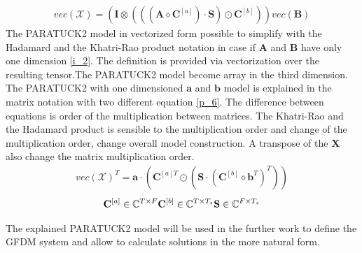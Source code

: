 \begin{align}
vec(\mathcal{X})=(\mathbf{I} \otimes (((\mathbf{A}\diamond \mathbf{C}^{[a]}) \cdot \mathbf{S}) \odot \mathbf{C}^{[b]} ))vec(\mathbf{B})
\label{p_5}
\end{align}
 The PARATUCK2 model in vectorized form possible to simplify with the Hadamard and the Khatri-Rao product notation in case if $\mathbf{A}$ and $\mathbf{B}$ have only one dimension \eqref{i_2}. The definition is provided via vectorization over the resulting tensor.The PARATUCK2 model become array in the third dimension.    The PARATUCK2 with one dimensioned $\mathbf{a}$ and $\mathbf{b}$  model is explained in the matrix notation with two different equation  \eqref{p_6}\cite{Book26}. The difference between equations is order of the multiplication between matrices. The Khatri-Rao and the Hadamard product is sensible to the multiplication order and change of the multiplication order, change overall model construction. A transpose of the $\mathbf{X}$ also change the matrix multiplication order.
\begin{align}
vec(\mathcal{X})^T=\mathbf{a}\cdot (\mathbf{C}^{[a]T} \odot (\mathbf{S}\cdot (\mathbf{C}^{[b]}\diamond \mathbf{b}^T)^T))
\label{p_6}
\end{align}
\begin{align*}
\mathbf{C}^{[a]} \in \mathbb{C}^{T \times F}
\mathbf{C}^{[b]} \in \mathbb{C}^{T \times T_s}
\mathbf{S} \in \mathbb{C}^{F \times T_s}
\end{align*}
 
The explained PARATUCK2 model will be used in the further work to define the GFDM system and allow to calculate solutions in the more natural form.
